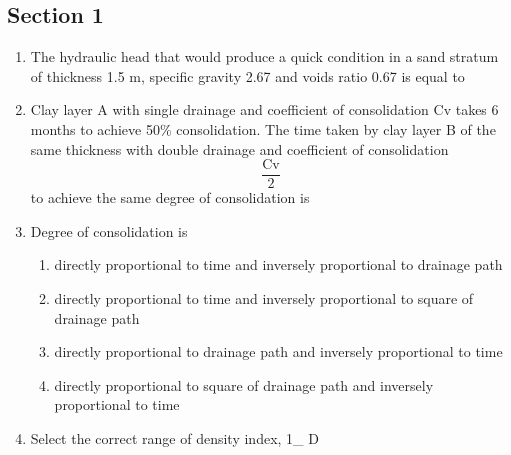 \documentclass[11pt,a4paper]{article}
\begin{document}
\subsection*{Section 1}
\begin{enumerate}
\item{The hydraulic head that would produce a quick condition in a sand stratum of thickness 1.5 m, specific gravity 2.67 and voids ratio 0.67 is equal to}
\\
\item{Clay layer A with single drainage and coefficient of consolidation Cv takes 6 months to achieve 50\% consolidation. The time taken by clay layer B of the same thickness with double drainage and coefficient of consolidation $$\frac{{{\text{Cv}}}}{2}$$ to achieve the same degree of consolidation is}
\\
\item{Degree of consolidation is}
\begin{enumerate}[label=\Alph*.]
\item{directly proportional to time and inversely proportional to drainage path}
\item{directly proportional to time and inversely proportional to square of drainage path}
\item{directly proportional to drainage path and inversely proportional to time}
\item{directly proportional to square of drainage path and inversely proportional to time}
\end{enumerate}
\item{Select the correct range of density index, 1\_ D}
\\
\end{enumerate}
\end{document}
